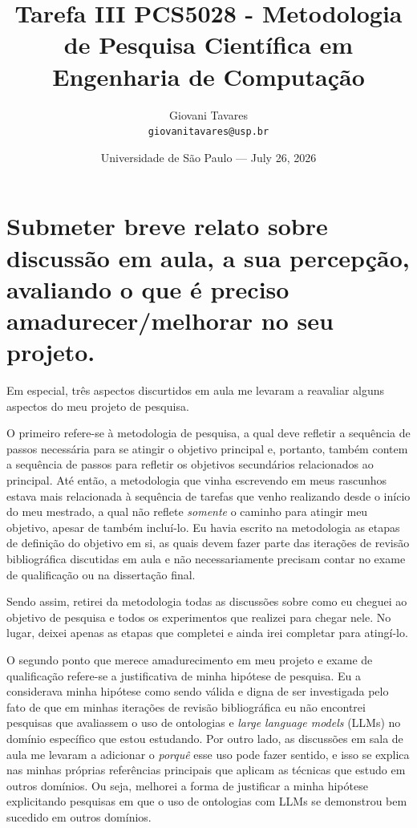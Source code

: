 \documentclass{article}
\title{Tarefa III PCS5028 - Metodologia de Pesquisa Científica em Engenharia de Computação} %
\author{Giovani Tavares\\ \texttt{giovanitavares@usp.br}} %
\date{Universidade de São Paulo --- July 26, 2026} %
\begin{document}
\maketitle %



\section*{Submeter breve relato sobre discussão em aula, a sua percepção, avaliando o que é preciso amadurecer/melhorar no seu projeto.}

Em especial, três aspectos discurtidos em aula me levaram a reavaliar alguns aspectos do meu projeto de pesquisa. 

O primeiro refere-se à metodologia de pesquisa, a qual deve refletir a sequência de passos necessária para se atingir o objetivo principal e, portanto, também contem a sequência de passos para refletir os objetivos secundários relacionados ao principal. Até então, a metodologia que vinha escrevendo em meus rascunhos estava mais relacionada à sequência de tarefas que venho realizando desde o início do meu mestrado, a qual não reflete \textit{somente} o caminho para atingir meu objetivo, apesar de também incluí-lo. Eu havia escrito na metodologia as etapas de definição do objetivo em si, as quais devem fazer parte das iterações de revisão bibliográfica discutidas em aula e não necessariamente precisam contar no exame de qualificação ou na dissertação final.

Sendo assim, retirei da metodologia todas as discussões sobre como eu cheguei ao objetivo de pesquisa e todos os experimentos que realizei para chegar nele. No lugar, deixei apenas as etapas que completei e ainda irei completar para atingí-lo. 

O segundo ponto que merece amadurecimento em meu projeto e exame de qualificação refere-se a justificativa de minha hipótese de pesquisa. Eu a considerava minha hipótese como sendo válida e digna de ser investigada pelo fato de que em minhas iterações de revisão bibliográfica eu não encontrei pesquisas que avaliassem o uso de ontologias e \textit{large language models} (LLMs)  no domínio específico que estou estudando. Por outro lado, as discussões em sala de aula me levaram a adicionar o \textit{porquê} esse uso pode fazer sentido, e isso se explica nas minhas próprias referências principais que aplicam as técnicas que estudo em outros domínios. Ou seja, melhorei a forma de justificar a minha hipótese explicitando pesquisas em que o uso de ontologias com LLMs se demonstrou bem sucedido em outros domínios. 
\end{document}

